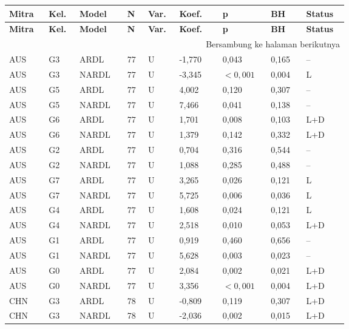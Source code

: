 {\footnotesize\setlength{\tabcolsep}{3pt}\renewcommand{\arraystretch}{1.15}
\begin{longtable}{p{0.075\linewidth}p{0.05\linewidth}p{0.09\linewidth}p{0.04\linewidth}p{0.05\linewidth}p{0.1\linewidth}p{0.085\linewidth}p{0.085\linewidth}p{0.075\linewidth}}
\toprule
\textbf{Mitra} & \textbf{Kel.} & \textbf{Model} & \textbf{N} & \textbf{Var.} & \textbf{Koef.} & \textbf{p} & \textbf{BH} & \textbf{Status}\\
\midrule
\endfirsthead
\toprule
\textbf{Mitra} & \textbf{Kel.} & \textbf{Model} & \textbf{N} & \textbf{Var.} & \textbf{Koef.} & \textbf{p} & \textbf{BH} & \textbf{Status}\\
\midrule
\endhead
\midrule\multicolumn{9}{r}{\footnotesize Bersambung ke halaman berikutnya}\\\endfoot
\bottomrule\endlastfoot
AUS & G3 & ARDL & 77 & U & -1,770 & 0,043 & 0,165 & --\\
AUS & G3 & NARDL & 77 & U & -3,345 & \(<0{,}001\) & 0,004 & L\\
AUS & G5 & ARDL & 77 & U & 4,002 & 0,120 & 0,307 & --\\
AUS & G5 & NARDL & 77 & U & 7,466 & 0,041 & 0,138 & --\\
AUS & G6 & ARDL & 77 & U & 1,701 & 0,008 & 0,103 & L+D\\
AUS & G6 & NARDL & 77 & U & 1,379 & 0,142 & 0,332 & L+D\\
AUS & G2 & ARDL & 77 & U & 0,704 & 0,316 & 0,544 & --\\
AUS & G2 & NARDL & 77 & U & 1,088 & 0,285 & 0,488 & --\\
AUS & G7 & ARDL & 77 & U & 3,265 & 0,026 & 0,121 & L\\
AUS & G7 & NARDL & 77 & U & 5,725 & 0,006 & 0,036 & L\\
AUS & G4 & ARDL & 77 & U & 1,608 & 0,024 & 0,121 & L\\
AUS & G4 & NARDL & 77 & U & 2,518 & 0,010 & 0,053 & L+D\\
AUS & G1 & ARDL & 77 & U & 0,919 & 0,460 & 0,656 & --\\
AUS & G1 & NARDL & 77 & U & 5,628 & 0,003 & 0,023 & --\\
AUS & G0 & ARDL & 77 & U & 2,084 & 0,002 & 0,021 & L+D\\
AUS & G0 & NARDL & 77 & U & 3,356 & \(<0{,}001\) & 0,004 & L+D\\
CHN & G3 & ARDL & 78 & U & -0,809 & 0,119 & 0,307 & L+D\\
CHN & G3 & NARDL & 78 & U & -2,036 & 0,002 & 0,015 & L+D\\

\end{longtable}}
